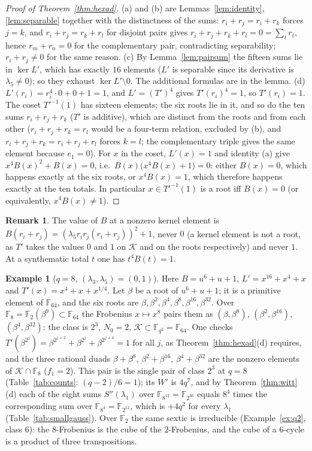 ﻿\documentclass[12pt,a4paper]{amsart}
\theoremstyle{definition}
\newtheorem{remark}[theorem]{Remark}
\newtheorem{example}[theorem]{Example}
\newcommand{\F}{\mathbb{F}}
\newcommand{\Kk}{\mathcal{K}}
\newcommand{\Spp}{S''}
\begin{document}
\begin{proof}[Proof of Theorem~\ref{thm:hexad}]
(a) and (b) are Lemmas~\ref{lem:identity}, \ref{lem:separable} together with the distinctness of the sums: $r_i+r_j=r_i+r_k$ forces $j=k$, and $r_i+r_j=r_k+r_l$ for disjoint pairs gives $r_i+r_j+r_k+r_l=0=\sum_tr_t$, hence $r_m+r_n=0$ for the complementary pair, contradicting separability; $r_i+r_j\ne0$ for the same reason. (c) By Lemma~\ref{lem:pairsum} the fifteen sums lie in $\ker L'$, which has exactly $16$ elements ($L'$ is separable since its derivative is $\lambda_5\ne0$); so they exhaust $\ker L'\setminus0$. The additional formulas are in the lemma. (d) $L'(r_i)=r_i^4\cdot0+0+1=1$, and $L'=(T')^4$ gives $T'(r_i)^4=1$, so $T'(r_i)=1$. The coset $T'^{-1}(1)$ has sixteen elements; the six roots lie in it, and so do the ten sums $r_i+r_j+r_k$ ($T'$ is additive), which are distinct from the roots and from each other ($r_i+r_j+r_k=r_l$ would be a four-term relation, excluded by (b), and $r_i+r_j+r_k=r_i+r_j+r_l$ forces $k=l$; the complementary triple gives the same element because $e_1=0$). For $x$ in the coset, $L'(x)=1$ and identity (a) give $x^4B(x)^2+B(x)=0$, i.e.\ $B(x)\bigl(x^4B(x)+1\bigr)=0$: either $B(x)=0$, which happens exactly at the six roots, or $x^4B(x)=1$, which therefore happens exactly at the ten totals. In particular $x\in T'^{-1}(1)$ is a root iff $B(x)=0$ (or equivalently, $x^4B(x)\ne1$).
\end{proof}

\begin{remark}
The value of $B$ at a nonzero kernel element is $B(r_i+r_j)=(\lambda_5r_ir_j(r_i+r_j))^2+1$, never $0$ (a kernel element is not a root, as $T'$ takes the values $0$ and $1$ on $\Kk$ and on the roots respectively) and never $1$. At a synthematic total $t$ one has $t^4B(t)=1$.
\end{remark}

\begin{example}[$q=8$, $(\lambda_3,\lambda_5)=(0,1)$]\label{ex:q8}
Here $B=u^6+u+1$, $L'=x^{16}+x^4+x$ and $T'(x)=x^4+x+x^{1/4}$. Let $\beta$ be a root of $u^6+u+1$; it is a primitive element of $\F_{64}$, and the six roots are $\beta,\beta^2,\beta^4,\beta^8,\beta^{16},\beta^{32}$. Over $\F_8=\F_2(\beta^9)\subset\F_{64}$ the Frobenius $x\mapsto x^8$ pairs them as $(\beta,\beta^8)$, $(\beta^2,\beta^{16})$, $(\beta^4,\beta^{32})$: the class is $2^3$, $N_0=2$, $\Kk\subset\F_{q^2}=\F_{64}$. One checks $T'(\beta^{2^j})=\beta^{2^{j+2}}+\beta^{2^j}+\beta^{2^{j+4}}=1$ for all $j$, as Theorem~\ref{thm:hexad}(d) requires, and the three rational duads $\beta+\beta^8$, $\beta^2+\beta^{16}$, $\beta^4+\beta^{32}$ are the nonzero elements of $\Kk\cap\F_8$ ($f_1=2$). This pair is the single pair of class $2^3$ at $q=8$ (Table~\ref{tab:counts}: $(q-2)/6=1$); its $W'$ is $4q^7$, and by Theorem~\ref{thm:witt}(d) each of the eight sums $\Spp(\lambda_1)$ over $\F_{8^{12}}=\F_{2^{36}}$ equals $8^4$ times the corresponding sum over $\F_{8^4}=\F_{2^{12}}$, which is $+4q^2$ for every $\lambda_1$ (Table~\ref{tab:smallgauss}). Over $\F_2$ the same sextic is irreducible (Example~\ref{ex:q2}, class $6$): the $8$-Frobenius is the cube of the $2$-Frobenius, and the cube of a $6$-cycle is a product of three transpositions.
\end{example}
\end{document}

